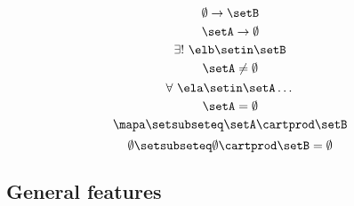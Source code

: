\begin{forslides}
\begin{equation}\label{eq:slides_session2_114}
\emptyset \to \setB
\end{equation}
\begin{equation}\label{eq:slides_session2_115}
\setA \to \emptyset
\end{equation}
\begin{equation}\label{eq:slides_session2_116}
\exists ! \ \elb \setin\setB
\end{equation}
\begin{equation}\label{eq:slides_session2_117}
\setA \neq \emptyset
\end{equation}
\begin{equation}\label{eq:slides_session2_118}
\forall \ \ela \setin\setA \dots
\end{equation}
\begin{equation}\label{eq:slides_session2_119}
\setA = \emptyset
\end{equation}
\begin{equation}\label{eq:slides_session2_120}
\mapa \setsubseteq \setA \cartprod \setB
\end{equation}
\begin{equation}\label{eq:slides_session2_121}
\emptyset \setsubseteq \emptyset \cartprod \setB = \emptyset
\end{equation}

\subsection{General features}


\end{forslides}
